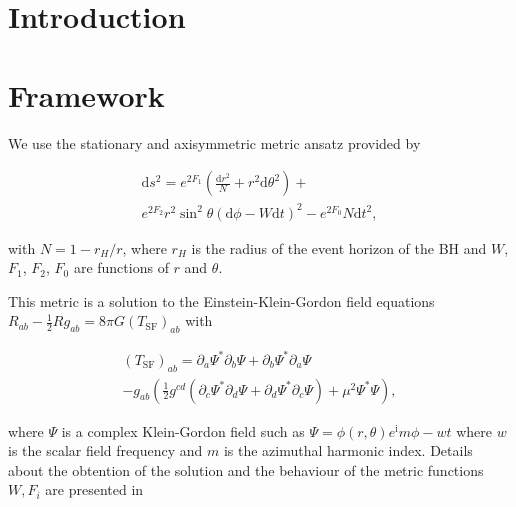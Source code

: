 \documentclass[twocolumn,aps,showpacs,showkeys,prd,superscriptaddress,byrevtex, amsmath]{revtex4-1}
\begin{document}

\section{Introduction}

\section{}

\section{Framework}




We use the stationary and axisymmetric metric ansatz provided by\cite{Herdeiro:2014a}

\begin{equation}
\begin{split}
\mathrm{d}s^2 = e^{2F_1}\left(\frac{\mathrm{d}r^2}{N} + r^2\mathrm{d}\theta^2\right) + \\ e^{2F_2}r^2\sin^2 \theta(\mathrm{d}\phi-W\mathrm{d}t)^2 -  e^{2F_0}N\mathrm{d}t^2,
\end{split}
\end{equation}

with $N = 1 - r_H/r$, where $r_H$ is the radius of the event horizon of the BH and $W$, $F_1$, $F_2$, $F_0$ are functions of $r$ and $\theta$.

This metric is a solution to the Einstein-Klein-Gordon field equations $R_{ab} - \frac{1}{2}R g _{ab} = 8 \pi G (T_{\mathrm{SF}})_{ab}$ with 

\begin{equation}\label{eq:e-m_scalaf_field}
\begin{split}
(T_{\mathrm{SF}})_{ab} = \partial_a \Psi^* \partial_b \Psi + \partial_b \Psi^* \partial_a \Psi \\ - g_{ab} \left(\frac{1}{2} g^{cd}(\partial_c \Psi^* \partial_d \Psi + \partial_d \Psi^* \partial_c \Psi) + \mu^2 \Psi^* \Psi \right),
\end{split}
\end{equation}

where $\Psi$ is a complex Klein-Gordon field such as $\Psi = \phi(r, \theta) e^\mathrm{i}{m\phi - w t}$ where $w$ is the scalar field frequency and $m$ is the azimuthal harmonic index. Details about the obtention of the solution and the behaviour of the metric functions ${W, F_i}$ are presented in~\cite{Herdeiro:2015b}
\end{document}

